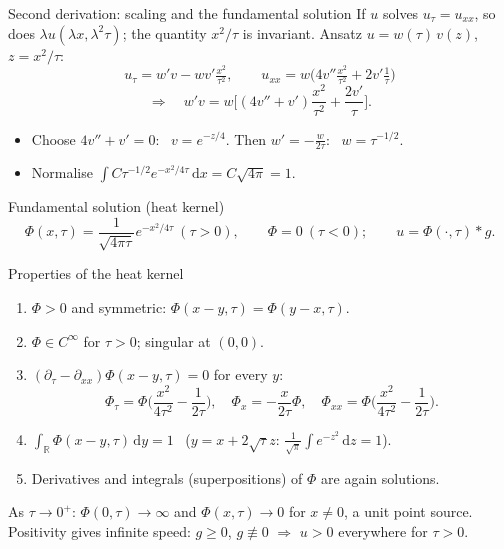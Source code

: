 \documentclass[11pt]{beamer}
\newcommand{\dd}{\,\mathrm d}
\begin{document}
\begin{frame}{Second derivation: scaling and the fundamental solution}
  If $u$ solves $u_\tau=u_{xx}$, so does $\lambda u(\lambda x,\lambda^2\tau)$; the quantity $x^2/\tau$ is
  invariant. Ansatz $u=w(\tau)\,v(z)$, $z=x^2/\tau$:
  \[
    u_\tau=w'v-wv'\tfrac{x^2}{\tau^2},\qquad u_{xx}=w\Big(4v''\tfrac{x^2}{\tau^2}+2v'\tfrac1\tau\Big)
  \]
  \[
    \Rightarrow\quad w'v=w\Big[(4v''+v')\frac{x^2}{\tau^2}+\frac{2v'}{\tau}\Big].
  \]
  \begin{itemize}
    \item Choose $4v''+v'=0$: \ $v=e^{-z/4}$. Then $w'=-\frac{w}{2\tau}$: \ $w=\tau^{-1/2}$.
    \item Normalise $\int C\tau^{-1/2}e^{-x^2/4\tau}\dd x=C\sqrt{4\pi}=1$.
  \end{itemize}
  \begin{block}{Fundamental solution (heat kernel)}
    \[
      \Phi(x,\tau)=\frac{1}{\sqrt{4\pi\tau}}e^{-x^2/4\tau}\ (\tau>0),\qquad \Phi=0\ (\tau<0);\qquad
      u=\Phi(\cdot,\tau)*g .
    \]
  \end{block}
\end{frame}

\begin{frame}{Properties of the heat kernel}
  \begin{enumerate}
    \item[(i)] $\Phi>0$ and symmetric: $\Phi(x-y,\tau)=\Phi(y-x,\tau)$.
    \item[(ii)] $\Phi\in C^\infty$ for $\tau>0$; singular at $(0,0)$.
    \item[(iii)] $(\partial_\tau-\partial_{xx})\Phi(x-y,\tau)=0$ for every $y$:
      {\small
      \[
        \Phi_\tau=\Phi\Big(\frac{x^2}{4\tau^2}-\frac1{2\tau}\Big),\quad \Phi_x=-\frac{x}{2\tau}\Phi,\quad
        \Phi_{xx}=\Phi\Big(\frac{x^2}{4\tau^2}-\frac1{2\tau}\Big).
      \]}
    \item[(iv)] $\int_{\mathbb R}\Phi(x-y,\tau)\dd y=1$ \ ($y=x+2\sqrt\tau z$:
      $\frac1{\sqrt\pi}\int e^{-z^2}\dd z=1$).
    \item[(v)] Derivatives and integrals (superpositions) of $\Phi$ are again solutions.
  \end{enumerate}
  \vspace{4pt}
  As $\tau\to0^+$: $\Phi(0,\tau)\to\infty$ and $\Phi(x,\tau)\to0$ for $x\neq0$, a unit point source.
  {\small Positivity gives infinite speed: $g\ge0$, $g\not\equiv0$ $\Rightarrow$ $u>0$ everywhere for $\tau>0$.}
\end{frame}
\end{document}
